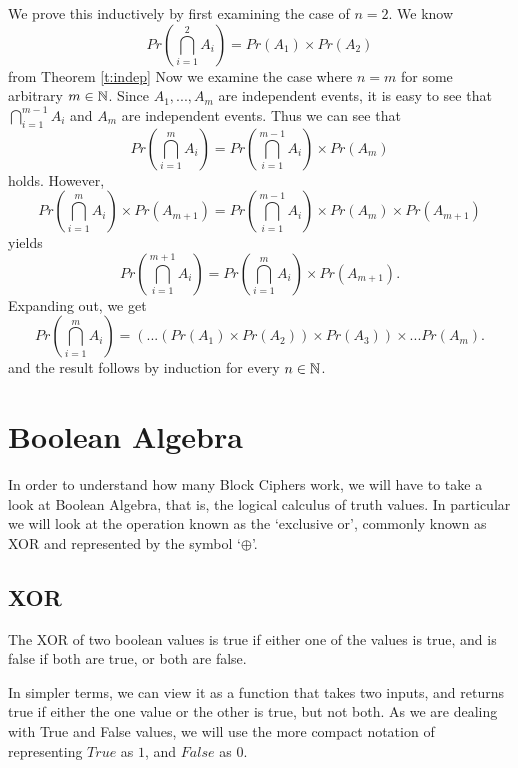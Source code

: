 \begin{prf}
We prove this inductively by first examining the case of $n = 2$.
We know
\begin{equation}
Pr\left(\bigcap _{i=1} ^2 A_i \right) = Pr(A_1) \times Pr(A_2)
\end{equation}
from Theorem \ref{t:indep}
Now we examine the case where $n = m$ for some arbitrary $m \in {\mathbb N}$. 
Since $A_1, ... , A_m$ are independent events, it is easy to see that
$\bigcap _{i=1} ^{m-1} A_i$ and $A_m$ are independent events. Thus we
can see that
\begin{equation}
Pr\left(\bigcap _{i=1} ^m A_i \right) = Pr\left(\bigcap _{i=1} ^{m-1} A_i \right) \times Pr(A_m)
\end{equation}
holds. However,
\begin{equation}
Pr\left(\bigcap _{i=1} ^m A_i \right) \times Pr(A_{m+1}) = Pr\left(\bigcap _{i=1} ^{m-1} A_i \right) \times Pr(A_m) \times Pr(A_{m+1})
\end{equation}
yields
\begin{equation}
Pr\left(\bigcap _{i=1} ^{m+1} A_i \right) = Pr\left(\bigcap _{i=1} ^{m} A_i \right) \times Pr(A_{m+1}).
\end{equation}
Expanding out, we get
\begin{equation}
Pr\left(\bigcap _{i=1} ^{m} A_i \right) = (...(Pr(A_1) \times Pr(A_2)) \times Pr(A_3)) \times ... Pr(A_m).
\end{equation}
and the result follows by induction for every $n \in {\mathbb N}$.
\end{prf}

\section{Boolean Algebra}
In order to understand how many Block Ciphers work, we will have to take a 
look at Boolean Algebra, that is, the logical calculus of truth values.
In particular we will look at the operation known as the `exclusive or', 
commonly known as XOR and represented by the symbol `$\oplus$'.

\subsection{XOR}
\begin{defn}
The XOR of two boolean values is true if either one of the values is true,
and is false if both are true, or both are false.
\end{defn}
In simpler terms, we can view it as a function that takes two inputs, and 
returns true if either the one value or the other is true, but not both.
As we are dealing with True and False values, we will use the more compact
notation of representing $True$ as $1$, and $False$ as $0$. 

